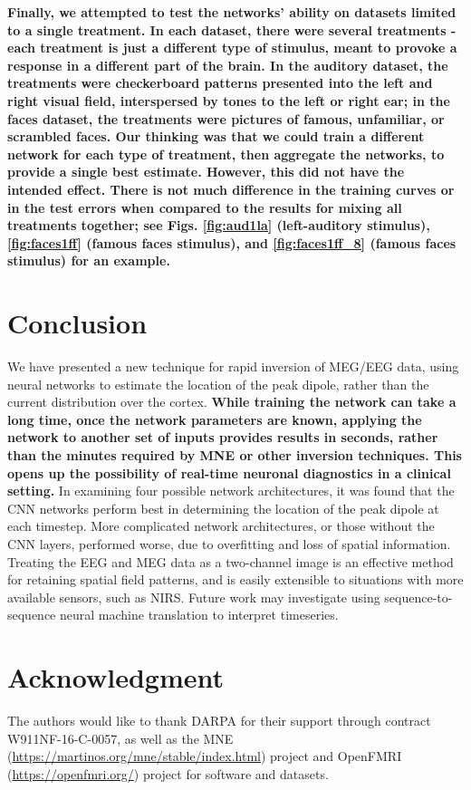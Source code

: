 \documentclass[journal,12pt,onecolumn,draftclsnofoot,]{IEEEtran}
\begin{document}
\textbf{Finally, we attempted to test the networks' ability on datasets limited to a single treatment. In each dataset, there were several treatments - each treatment is just a different type of stimulus, meant to provoke a response in a different part of the brain. In the auditory dataset, the treatments were checkerboard patterns presented into the left and right visual field, interspersed by tones to the left or right ear; in the faces dataset, the treatments were pictures of famous, unfamiliar, or scrambled faces. Our thinking was that we could train a different network for each type of treatment, then aggregate the networks, to provide a single best estimate. However, this did not have the intended effect. There is not much difference in the training curves or in the test errors when compared to the results for mixing all treatments together; see Figs. \ref{fig:aud1la} (left-auditory stimulus), \ref{fig:faces1ff} (famous faces stimulus), and \ref{fig:faces1ff_8} (famous faces stimulus) for an example.}


\section{Conclusion}
We have presented a new technique for rapid inversion of MEG/EEG data, using neural networks to estimate the location of the peak dipole, rather than the current distribution over the cortex. \textbf{While training the network can take a long time, once the network parameters are known, applying the network to another set of inputs provides results in seconds, rather than the minutes required by MNE or other inversion techniques. This opens up the possibility of real-time neuronal diagnostics in a clinical setting.} In examining four possible network architectures, it was found that the CNN networks perform best in determining the location of the peak dipole at each timestep. More complicated network architectures, or those without the CNN layers, performed worse, due to overfitting and loss of spatial information. Treating the EEG and MEG data as a two-channel image is an effective method for retaining spatial field patterns, and is easily extensible to situations with more available sensors, such as NIRS. Future work may investigate using sequence-to-sequence neural machine translation to interpret timeseries.


\section*{Acknowledgment}
The authors would like to thank DARPA for their support through contract W911NF-16-C-0057, as well as the MNE (\url{https://martinos.org/mne/stable/index.html}) project and OpenFMRI (\url{https://openfmri.org/}) project for software and datasets.
\end{document}
